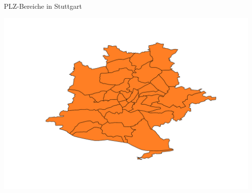 \begin{frame}[fragile]{PLZ-Bereiche in Stuttgart}

\begin{Shaded}
\begin{Highlighting}[]
\StringTok{ }\NormalTok{PLZ[PLZ}\OperatorTok{$}\OperatorTok{==}\NormalTok{,]}
\NormalTok{)}
\end{Highlighting}
\end{Shaded}

\includegraphics{ps_user_stuttgart_part3_files/figure-beamer/unnamed-chunk-22-1.pdf}

\end{frame}

